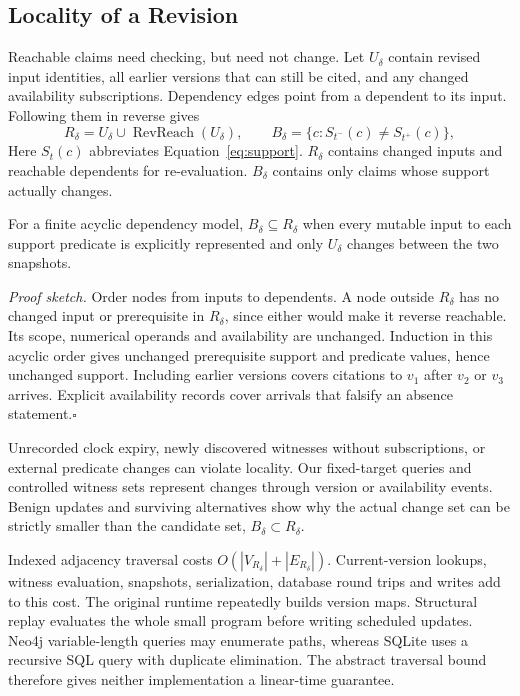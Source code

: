 \subsection{Locality of a Revision}

Reachable claims need checking, but need not change.
Let $U_\delta$ contain revised input identities, all earlier versions that can
still be cited, and any changed availability subscriptions. Dependency edges
point from a dependent to its input. Following them in reverse gives
\begin{equation}
 R_\delta=U_\delta\cup\operatorname{RevReach}(U_\delta),\qquad
 B_\delta=\{c:S_{t^-}(c)\ne S_{t^+}(c)\},
 \label{eq:locality}
\end{equation}
Here $S_t(c)$ abbreviates Equation~\ref{eq:support}.
$R_\delta$ contains changed inputs and reachable dependents for re-evaluation.
$B_\delta$ contains only claims whose support actually changes.

\begin{proposition}
For a finite acyclic dependency model, $B_\delta\subseteq R_\delta$ when every
mutable input to each support predicate is explicitly represented and only
$U_\delta$ changes between the two snapshots.
\end{proposition}
\noindent\emph{Proof sketch.}
Order nodes from inputs to dependents. A node outside $R_\delta$ has no changed
input or prerequisite in $R_\delta$, since either would make it reverse reachable.
Its scope, numerical operands and availability are unchanged. Induction in this
acyclic order gives unchanged prerequisite support and predicate values, hence
unchanged support. Including earlier versions covers citations to $v_1$ after
$v_2$ or $v_3$ arrives. Explicit availability records cover arrivals that falsify
an absence statement.\hfill$\square$

Unrecorded clock expiry, newly discovered witnesses without subscriptions, or
external predicate changes can violate locality. Our fixed-target queries and
controlled witness sets represent changes through version or availability events.
Benign updates and surviving alternatives show why the actual change set can be
strictly smaller than the candidate set, $B_\delta\subset R_\delta$.

Indexed adjacency traversal costs $O(|V_{R_\delta}|+|E_{R_\delta}|)$.
Current-version lookups, witness evaluation, snapshots, serialization, database
round trips and writes add to this cost. The original runtime repeatedly builds
version maps. Structural replay evaluates the whole small program before writing
scheduled updates. Neo4j variable-length queries may enumerate paths, whereas
SQLite uses a recursive SQL query with duplicate elimination. The abstract traversal
bound therefore gives neither implementation a linear-time guarantee.

